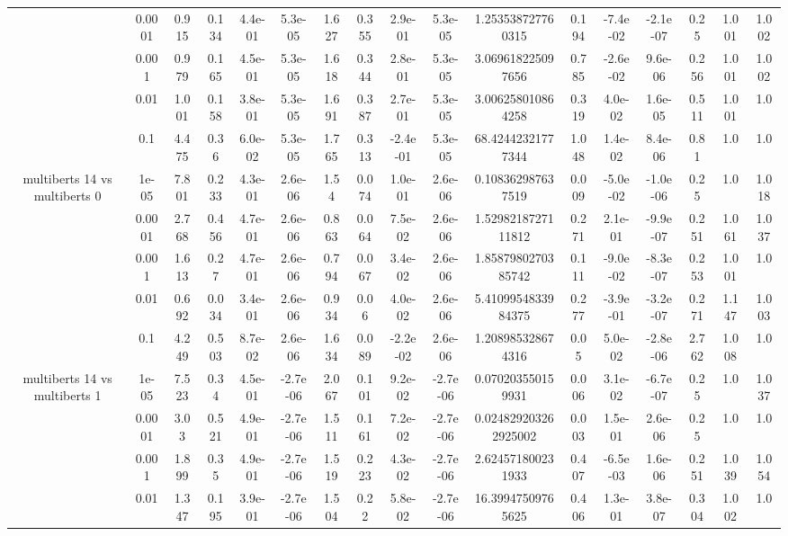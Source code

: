 \begin{tabular}{|c|c|c|c|c|c|c|c|c|c|c|c|c|c|c|c|c|}
 & 0.0001 & 0.915 & 0.134 & 4.4e-01 & 5.3e-05 & 1.627 & 0.355 & 2.9e-01 & 5.3e-05 & 1.253538727760315 & 0.194 & -7.4e-02 & -2.1e-07 & 0.25 & 1.001 & 1.002 \\
 & 0.001 & 0.979 & 0.165 & 4.5e-01 & 5.3e-05 & 1.618 & 0.344 & 2.8e-01 & 5.3e-05 & 3.069618225097656 & 0.785 & -2.6e-02 & 9.6e-06 & 0.256 & 1.001 & 1.002 \\
 & 0.01 & 1.001 & 0.158 & 3.8e-01 & 5.3e-05 & 1.691 & 0.387 & 2.7e-01 & 5.3e-05 & 3.006258010864258 & 0.319 & 4.0e-02 & 1.6e-05 & 0.511 & 1.001 & 1.0 \\
 & 0.1 & 4.475 & 0.36 & 6.0e-02 & 5.3e-05 & 1.765 & 0.313 & -2.4e-01 & 5.3e-05 & 68.42442321777344 & 1.048 & 1.4e-02 & 8.4e-06 & 0.81 & 1.0 & 1.0 \\
\hline
\multirow{5}{*}{multiberts 14 vs multiberts 0} & 1e-05 & 7.801 & 0.233 & 4.3e-01 & 2.6e-06 & 1.54 & 0.074 & 1.0e-01 & 2.6e-06 & 0.108362987637519 & 0.009 & -5.0e-02 & -1.0e-06 & 0.25 & 1.0 & 1.018 \\
 & 0.0001 & 2.768 & 0.456 & 4.7e-01 & 2.6e-06 & 0.863 & 0.064 & 7.5e-02 & 2.6e-06 & 1.5298218727111812 & 0.271 & 2.1e-01 & -9.9e-07 & 0.251 & 1.061 & 1.037 \\
 & 0.001 & 1.613 & 0.27 & 4.7e-01 & 2.6e-06 & 0.794 & 0.067 & 3.4e-02 & 2.6e-06 & 1.8587980270385742 & 0.111 & -9.0e-02 & -8.3e-07 & 0.253 & 1.001 & 1.0 \\
 & 0.01 & 0.692 & 0.034 & 3.4e-01 & 2.6e-06 & 0.934 & 0.06 & 4.0e-02 & 2.6e-06 & 5.4109954833984375 & 0.277 & -3.9e-01 & -3.2e-07 & 0.271 & 1.147 & 1.003 \\
 & 0.1 & 4.249 & 0.503 & 8.7e-02 & 2.6e-06 & 1.634 & 0.089 & -2.2e-02 & 2.6e-06 & 1.208985328674316 & 0.05 & 5.0e-02 & -2.8e-06 & 2.762 & 1.008 & 1.0 \\
\hline
\multirow{5}{*}{multiberts 14 vs multiberts 1} & 1e-05 & 7.523 & 0.34 & 4.5e-01 & -2.7e-06 & 2.067 & 0.101 & 9.2e-02 & -2.7e-06 & 0.070203550159931 & 0.006 & 3.1e-02 & -6.7e-07 & 0.25 & 1.0 & 1.037 \\
 & 0.0001 & 3.03 & 0.521 & 4.9e-01 & -2.7e-06 & 1.511 & 0.161 & 7.2e-02 & -2.7e-06 & 0.024829203262925002 & 0.003 & 1.5e-01 & 2.6e-06 & 0.25 & 1.0 & 1.0 \\
 & 0.001 & 1.899 & 0.35 & 4.9e-01 & -2.7e-06 & 1.519 & 0.223 & 4.3e-02 & -2.7e-06 & 2.624571800231933 & 0.407 & -6.5e-03 & 1.6e-06 & 0.251 & 1.039 & 1.054 \\
 & 0.01 & 1.347 & 0.195 & 3.9e-01 & -2.7e-06 & 1.504 & 0.22 & 5.8e-02 & -2.7e-06 & 16.39947509765625 & 0.406 & 1.3e-01 & 3.8e-07 & 0.304 & 1.002 & 1.0 \\

\end{tabular}
